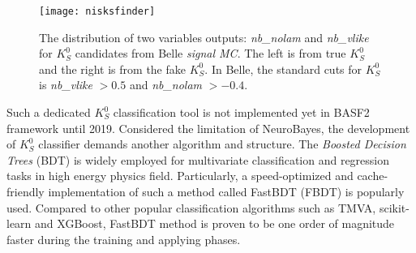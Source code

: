 \begin{figure}[htpb]
	\centering 
	\texttt{[image: nisksfinder]}
	\caption{The distribution of two variables outputs: \textit{nb\_nolam} and \textit{nb\_vlike} for $K_S^0$ candidates from Belle \textit{signal MC}. The left is from true $K_S^0$ and the right is from the fake $K_S^0$. In Belle, the standard cuts for $K_S^0$ is \textit{nb\_vlike} $> 0.5$ and \textit{nb\_nolam} $> -0.4$\cite{kang2020measurement}.}
	\label{b1niskf}
\end{figure}


Such a dedicated $K_S^0$ classification tool is not implemented yet in BASF2 framework until 2019. Considered the limitation of NeuroBayes, the development of $K_S^0$ classifier demands another algorithm and structure. The \textit{Boosted Decision Trees} (BDT) is widely employed for multivariate classification and regression tasks in high energy physics field. Particularly, a speed-optimized and cache-friendly
implementation of such a method called FastBDT (FBDT) is popularly used\cite{keck2016fastbdt}. Compared to other popular classification algorithms such as TMVA\cite{therhaag2012tmva}, scikit-learn\cite{pedregosa2011scikit} and XGBoost\cite{chen2016xgboost}, FastBDT method is proven to be one order of magnitude faster during the training and applying phases\cite{keck2016fastbdt}. 
